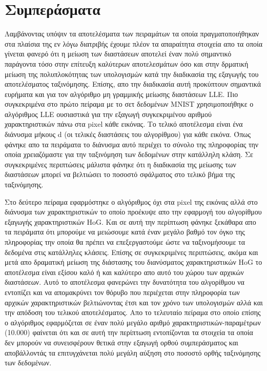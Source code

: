 \chapter{Συμπεράσματα}
\par
Λαμβάνοντας υπόψιν τα αποτελέσματα των πειραμάτων τα οποία πραγματοποιήθηκαν στα πλαίσια της εν λόγω διατριβής έχουμε πλέον τα απαραίτητα στοιχεία απο τα οποία γίνεται φανερό ότι η μείωση των διαστάσεων αποτελεί έναν πολύ σημαντικό παράγοντα τόσο στην επίτευξη καλύτερων αποτελεσμάτων όσο και στην δρματική μείωση της πολυπλοκότητας των υπολογισμών κατά την διαδικασία της εξαγωγής του αποτελέσματος ταξινόμησης. Επίσης, απο την διαδικασία αυτή προκύπτουν σημαντικά ευρήματα και για τον αλγόριθμο μη γραμμικής μείωσης διαστάσεων \textlatin{LLE}. Πιο συγκεκριμένα στο πρώτο πείραμα με το σετ δεδομένων \textlatin{MNIST} χρησιμοποιήθηκε ο αλγόριθμος \textlatin{LLE} ουσιαστικά για την εξαγωγή συγκεκριμένου αριθμού χαρακτηριστικών πάνω στα \textlatin{pixel} κάθε εικόνας. Το τελικό αποτέλεσμα είναι ένα διάνυσμα μήκους \textlatin{d} (οι τελικές διαστάσεις του αλγορίθμου) για κάθε εικόνα. Όπως φάνηκε απο τα πειράματα το διάνυσμα αυτό περιέχει το σύνολο της πληροφορίας την οποία χρειαζόμαστε για την ταξινόμηση των δεδομένων στην κατάλληλη κλάση. Σε συγκεκριμένες περιπτώσεις μάλιστα φάνηκε ότι η διαδικασία της μείωσης των διαστάσεων μπορεί να βελτιώσει το ποσοστό σφάλματος στο τελικό βήμα της ταξινόμησης. 
\par
Στο δεύτερο πείραμα εφαρμόστηκε ο αλγόριθμος όχι στα \textlatin{pixel} της εικόνας αλλά στο διάνυσμα των χαρακτηριστικών το οποίο προέκυψε απο την εφαρμογή του αλγορίθμου εξαγωγής χαρακτηριστικών \textlatin{HoG}. Και σε αυτή την περίπτωση φάνηκε ξεκάθαρα απο τα πειράματα ότι μπορούμε να μειώσουμε κατά έναν μεγάλο βαθμό τον όγκο της πληροφορίας την οποία θα πρέπει να επεξεργαστούμε ώστε να ταξινομήσουμε τα δεδομένα στις κατάλληλες κλάσεις. Επίσης σε συγκεκριμένες περιπτώσεις, ακόμα και μετά απο δραματική μείωση της διάστασης του διανύσματος χαρακτηριστικών \textlatin{HoG} το αποτέλεσμα είναι εξίσου καλό ή και καλύτερο απο αυτό του χώρου των αρχικών διαστάσεων. Αυτό το αποτέλεσμα φανερώνει την δυνατότητα του αλγορίθμου να εντοπίζει και να απομακρύνει τον θόρυβο που περιέχεται στην πληροφορία των αρχικών χαρακτηριστικών βελτιώνοντας έτσι και τον χρόνο των υπολογισμών αλλά και την απόδοση του τελικού αποτελέσματος. Απο το τελευταίο πείραμα στο οποίο επίσης ο αλγόριθμος εφαρμόζεται σε έναν πολύ μεγάλο αριθμό χαρακτηριστικών-παραμέτρων (10.000) φαίνεται ότι και σε αυτή την περίπτωση εντοπίζονται τα στοιχεία τα οποία δεν μπορούν να συνεισφέρουν θετικά στην εξαγωγή ορθού συμπεράσματος και αποβάλλοντάς τα επιτυγχάνεται πολύ μεγάλη αύξηση στο ποσοστό ορθής ταξινόμησης των δεδομένων.
